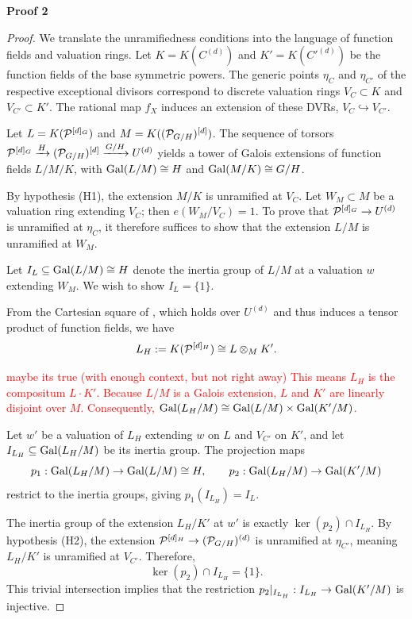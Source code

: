 \documentclass[11pt]{article}
\begin{document}
\textbf{Proof 2}
\begin{proof}
We translate the unramifiedness conditions into the language of function fields and valuation rings. Let $K = K(C^{(d)})$ and $K' = K(C'^{(d)})$ be the function fields of the base symmetric powers. The generic points $\eta_C$ and $\eta_{C'}$ of the respective exceptional divisors correspond to discrete valuation rings $V_C \subset K$ and $V_{C'} \subset K'$. The rational map $f_X$ induces an extension of these DVRs, $V_C \hookrightarrow V_{C'}$.

Let $L = K(\mathcal{P}^{[d]_G})$ and $M = K((\mathcal{P}_{G/H})^{[d]})$. The sequence of torsors $\mathcal{P}^{[d]_G} \xrightarrow{H} (\mathcal{P}_{G/H})^{[d]} \xrightarrow{G/H} U^{(d)}$ yields a tower of Galois extensions of function fields $L / M / K$, with $\operatorname{Gal}(L/M) \cong H$ and $\operatorname{Gal}(M/K) \cong G/H$.

By hypothesis (H1), the extension $M/K$ is unramified at $V_C$. Let $W_M \subset M$ be a valuation ring extending $V_C$; then $e(W_M / V_C) = 1$. To prove that $\mathcal{P}^{[d]_G} \to U^{(d)}$ is unramified at $\eta_C$, it therefore suffices to show that the extension $L/M$ is unramified at $W_M$.

Let $I_L \subseteq \operatorname{Gal}(L/M) \cong H$ denote the inertia group of $L/M$ at a valuation $w$ extending $W_M$. We wish to show $I_L = \{1\}$.

From the Cartesian square of , which holds over $U^{(d)}$ and thus induces a tensor product of function fields, we have
\[
L_H := K(\mathcal{P}^{[d]_H}) \cong L \otimes_M K'.
\]

\textcolor{red}{maybe its true (with enough context, but not right away)}
\textcolor{red}{This means $L_H$ is the compositum $L \cdot K'$. Because $L/M$ is a Galois extension, $L$ and $K'$ are linearly disjoint over $M$. Consequently, $\operatorname{Gal}(L_H/M) \cong \operatorname{Gal}(L/M) \times \operatorname{Gal}(K'/M)$.}


Let $w'$ be a valuation of $L_H$ extending $w$ on $L$ and $V_{C'}$ on $K'$, and let $I_{L_H} \subseteq \operatorname{Gal}(L_H/M)$ be its inertia group. The projection maps
\[
p_1 : \operatorname{Gal}(L_H/M) \to \operatorname{Gal}(L/M) \cong H, \qquad p_2 : \operatorname{Gal}(L_H/M) \to \operatorname{Gal}(K'/M)
\]
restrict to the inertia groups, giving $p_1(I_{L_H}) = I_L$.

The inertia group of the extension $L_H / K'$ at $w'$ is exactly $\ker(p_2) \cap I_{L_H}$. By hypothesis (H2), the extension $\mathcal{P}^{[d]_H} \to (\mathcal{P}_{G/H})^{(d)}$ is unramified at $\eta_{C'}$, meaning $L_H/K'$ is unramified at $V_{C'}$. Therefore,
\[
\ker(p_2) \cap I_{L_H} = \{1\}.
\]
This trivial intersection implies that the restriction $p_2|_{I_{L_H}} : I_{L_H} \to \operatorname{Gal}(K'/M)$ is injective.


\end{proof}
\end{document}
